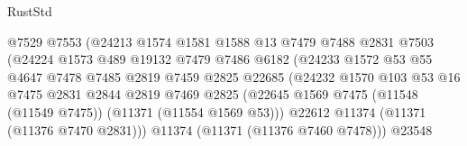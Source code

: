 \begin{lexlean}{RustStd}
\begin{coremodule}
                                      @7529
                                      @7553
                                      (@24213
                                        @1574
                                        @1581
                                        @1588
                                        @13
                                        @7479
                                        @7488
                                        @2831
                                        @7503
                                        (@24224
                                          @1573
                                          @489
                                          @19132
                                          @7479
                                          @7486
                                          @6182
                                          (@24233
                                            @1572
                                            @53
                                            @55
                                            @4647
                                            @7478
                                            @7485
                                            @2819
                                            @7459
                                            @2825
                                            @22685
                                            (@24232
                                              @1570
                                              @103
                                              @53
                                              @16
                                              @7475
                                              @2831
                                              @2844
                                              @2819
                                              @7469
                                              @2825
                                              (@22645
                                                @1569
                                                @7475
                                                (@11548 (@11549 @7475))
                                                (@11371 (@11554 @1569 @53)))
                                              @22612
                                              @11374
                                              (@11371 (@11376 @7470 @2831)))
                                            @11374
                                            (@11371 (@11376 @7460 @7478)))
                                          @23548

\end{coremodule}
\end{lexlean}

